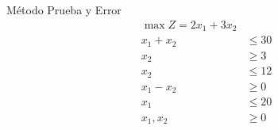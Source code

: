 \begin{frameExample}{Método Prueba y Error}{}
  \begin{align*}
    \max Z = 2x_1 + 3x_2 & \\[5mm]
    x_1 + x_2 & \leq 30\\
    x_2 & \geq 3\\
    x_2 & \leq 12\\
    x_1 - x_2 & \geq 0\\
    x_1  & \leq 20 \\[5mm]
    x_1, x_2 & \geq 0
  \end{align*}
\end{frameExample}


